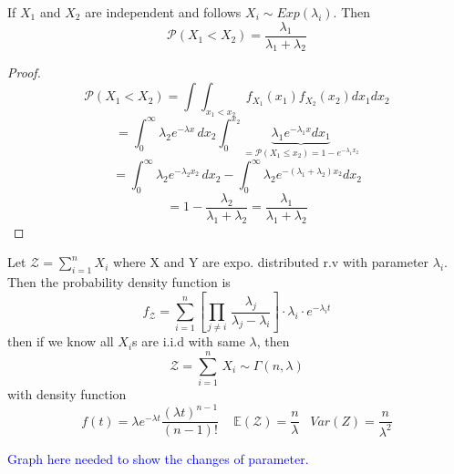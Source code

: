 \documentclass[10.5pt]{article}
\newcommand{\prob}[0]{\mathcal{P}}
\newenvironment{changemargin}[2]{%
  \begin{list}{}{%
    \setlength{\topsep}{0pt}%
    \setlength{\leftmargin}{#1}%
    \setlength{\rightmargin}{#2}%
    \setlength{\listparindent}{\parindent}%
    \setlength{\itemindent}{\parindent}%
    \setlength{\parsep}{\parskip}%
  }%
  \item[]}{\end{list}}
\begin{document}
\begin{changemargin}{-0.125in}{0in}
\begin{enumerate}
                   \smallskip
                   
                   \begin{proposition}
                   	If $X_1$ and $X_2$ are independent and follows $X_i \sim Exp(\lambda_i)$. Then 
                   	\[
                   	\prob(X_1 < X_2) = \frac{\lambda_1}{\lambda_1 + \lambda_2}
                   	\]
                   \end{proposition}
                   
                   \begin{proof}
                   	\[
                   	\prob(X_1 < X_2) = \int\int_{x_1 < x_2} f_{X_1}(x_1)f_{X_2}(x_2) dx_1 dx_2
                   	\]
                   	\[
                   	 = \int_0^{\infty}\lambda_2 e^{-\lambda x}\,dx_2 \int^{x_2}_{0} \underbrace{\lambda_1 e^{-\lambda_1 x}dx_1}_{=\prob(X_1 \leq x_2) = 1 - e^{-\lambda_1x_2}}
                   	\]
                   	\[
                   	 = \int_0^{\infty}\lambda_2 e^{-\lambda_2 x_2}\,dx_2 - \int^\infty_0\lambda_2 e^{-(\lambda_1 + \lambda_2)x_2}dx_2
                   	\]
                   	 \[
                   	  = 1 - \frac{\lambda_2}{\lambda_1 + \lambda_2} = \frac{\lambda_1}{\lambda_1 + \lambda_2}
                   	 \]
                   \end{proof}
                   
                   \begin{proposition}
                   	Let $\mathcal{Z} = \sum^n_{i = 1} X_i$ where X and Y are expo. distributed r.v with parameter $\lambda_i$. Then the probability density function is 
                   	\[
                   	f_{\mathcal{Z}} = \sum^n_{i = 1} [\prod_{j \neq i}\,       \frac{\lambda_j}{\lambda_j - \lambda_i}] \cdot \lambda_i \cdot e^{-\lambda_i t}
                   	\]
                   	then if we know all $X_i$s are i.i.d with same $\lambda$, then 
                   	\[
                   \mathcal{Z} = 	\sum_{i=1}^n\,X_i \sim \Gamma(n, \lambda)
                   	\]
                   	with density function 
                   	\[
                   	f(t) = \lambda e^{- \lambda t} \frac{(\lambda t)^{n-1}}{(n-1)!}\,\,\,\,\,\,\,\mathbb{E} (\mathcal{Z}) = \frac{n}{\lambda}\,\,\,\,\, Var(Z) = \frac{n}{\lambda^2}
                   	\]
                   \end{proposition}
                   
                   \textcolor{blue}{Graph here needed to show the changes of parameter.}
                   

\end{enumerate}
\end{changemargin}
\end{document}
